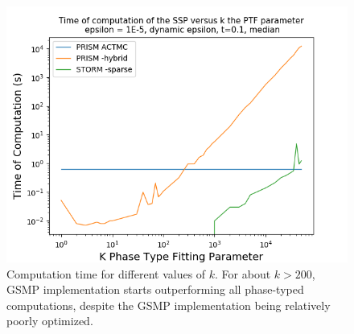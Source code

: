 \documentclass[paper=a4, fontsize=11pt]{scrartcl}
\numberwithin{equation}{section}		%
\numberwithin{figure}{section}			%
\numberwithin{table}{section}				%
\begin{document}
\begin{figure}
	\centering
	\includegraphics[width=16cm]{picture/New_model/1E-5/performance_dynamic.png}
	\caption{Computation time for different values of $k$. For about $k>200$, GSMP implementation starts outperforming all phase-typed computations, despite the GSMP implementation being relatively poorly optimized.}
	\label{fig:performance}
\end{figure}


\end{document}
